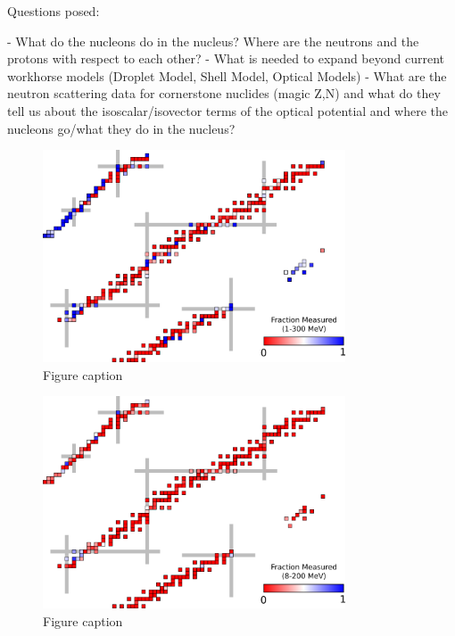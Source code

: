 Questions posed:

- What do the nucleons do in the nucleus? Where are the neutrons and the protons
with respect to each other?
- What is needed to expand beyond current workhorse models (Droplet Model,
Shell Model, Optical Models)
- What are the neutron scattering data for cornerstone nuclides (magic Z,N) and
what do they tell us about the isoscalar/isovector terms of the optical
potential and where the nucleons go/what they do in the nucleus?

\begin{figure}
    \includegraphics[width=0.8\textwidth]{figures/TCSChart.png}
    \caption{Figure caption}
    \label{chart}
\end{figure}

\begin{figure}
    \includegraphics[width=0.8\textwidth]{figures/RCSChart.png}
    \caption{Figure caption}
    \label{chart}
\end{figure}


%

